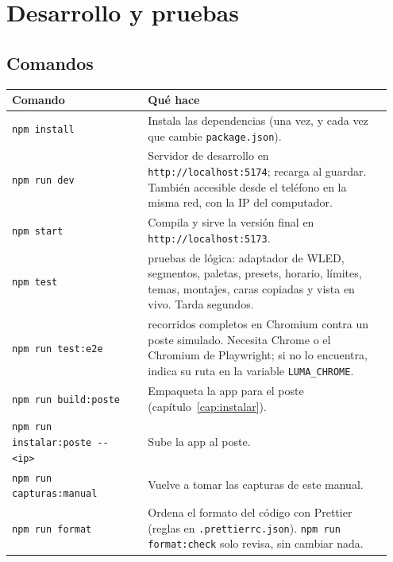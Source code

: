 \chapter{Desarrollo y pruebas}\label{cap:desarrollo}

\section{Comandos}

\begin{longtable}{@{}>{\raggedright\arraybackslash}p{0.34\linewidth} >{\raggedright\arraybackslash}p{0.61\linewidth}@{}}
\toprule
\textbf{Comando} & \textbf{Qué hace} \\ \midrule \endhead
\texttt{npm install} & Instala las dependencias (una vez, y cada vez que cambie \texttt{package.json}). \\
\texttt{npm run dev} & Servidor de desarrollo en \texttt{http://localhost:5174}; recarga al guardar. También accesible desde el teléfono en la misma red, con la IP del computador. \\
\texttt{npm start} & Compila y sirve la versión final en \texttt{http://localhost:5173}. \\
\texttt{npm test} & 43 pruebas de lógica: adaptador de WLED, segmentos, paletas, presets, horario, límites, temas, montajes, caras copiadas y vista en vivo. Tarda segundos. \\
\texttt{npm run test:e2e} & 10 recorridos completos en Chromium contra un poste simulado. Necesita Chrome o el Chromium de Playwright; si no lo encuentra, indica su ruta en la variable \texttt{LUMA\_CHROME}. \\
\texttt{npm run build:poste} & Empaqueta la app para el poste (capítulo~\ref{cap:instalar}). \\
\texttt{npm run instalar:poste -{}- <ip>} & Sube la app al poste. \\
\texttt{npm run capturas:manual} & Vuelve a tomar las capturas de este manual. \\
\texttt{npm run format} & Ordena el formato del código con Prettier (reglas en \texttt{.prettierrc.json}). \texttt{npm run format:check} solo revisa, sin cambiar nada. \\
\bottomrule
\end{longtable}



